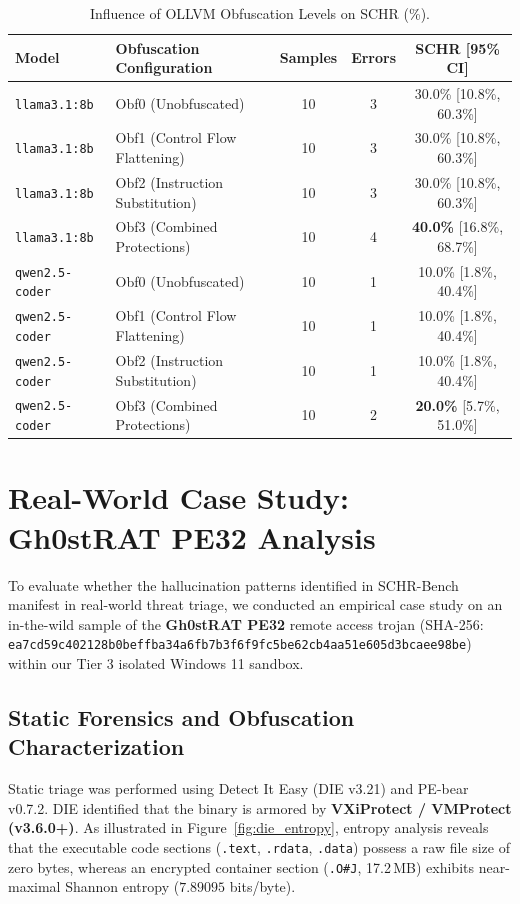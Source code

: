 \documentclass[runningheads]{llncs}
\begin{document}
\begin{table}[t]
\centering
\caption{Influence of OLLVM Obfuscation Levels on SCHR (\%).}
\label{tab:obfuscation}
\begin{tabular}{llccc}
\toprule
\textbf{Model} & \textbf{Obfuscation Configuration} & \textbf{Samples} & \textbf{Errors} & \textbf{SCHR [95\% CI]} \\
\midrule
\texttt{llama3.1:8b} & Obf0 (Unobfuscated) & 10 & 3 & 30.0\% [10.8\%, 60.3\%] \\
\texttt{llama3.1:8b} & Obf1 (Control Flow Flattening) & 10 & 3 & 30.0\% [10.8\%, 60.3\%] \\
\texttt{llama3.1:8b} & Obf2 (Instruction Substitution) & 10 & 3 & 30.0\% [10.8\%, 60.3\%] \\
\texttt{llama3.1:8b} & Obf3 (Combined Protections) & 10 & 4 & \textbf{40.0\%} [16.8\%, 68.7\%] \\
\midrule
\texttt{qwen2.5-coder} & Obf0 (Unobfuscated) & 10 & 1 & 10.0\% [1.8\%, 40.4\%] \\
\texttt{qwen2.5-coder} & Obf1 (Control Flow Flattening) & 10 & 1 & 10.0\% [1.8\%, 40.4\%] \\
\texttt{qwen2.5-coder} & Obf2 (Instruction Substitution) & 10 & 1 & 10.0\% [1.8\%, 40.4\%] \\
\texttt{qwen2.5-coder} & Obf3 (Combined Protections) & 10 & 2 & \textbf{20.0\%} [5.7\%, 51.0\%] \\
\bottomrule
\end{tabular}
\end{table}

\section{Real-World Case Study: Gh0stRAT PE32 Analysis}
To evaluate whether the hallucination patterns identified in SCHR-Bench manifest in real-world threat triage, we conducted an empirical case study on an in-the-wild sample of the \textbf{Gh0stRAT PE32} remote access trojan (SHA-256: \texttt{ea7cd59c402128b0beffba34a6fb7b3f6f9fc5be62cb4aa51e605d3bcaee98be})~\cite{mitre2024gh0st} within our Tier 3 isolated Windows 11 sandbox.

\subsection{Static Forensics and Obfuscation Characterization}
Static triage was performed using Detect It Easy (DIE v3.21) and PE-bear v0.7.2. DIE identified that the binary is armored by \textbf{VXiProtect / VMProtect (v3.6.0+)}. As illustrated in Figure~\ref{fig:die_entropy}, entropy analysis reveals that the executable code sections (\texttt{.text}, \texttt{.rdata}, \texttt{.data}) possess a raw file size of zero bytes, whereas an encrypted container section (\texttt{.O\#J}, 17.2\,MB) exhibits near-maximal Shannon entropy ($\mathbf{7.89095}$ bits/byte).
\end{document}
